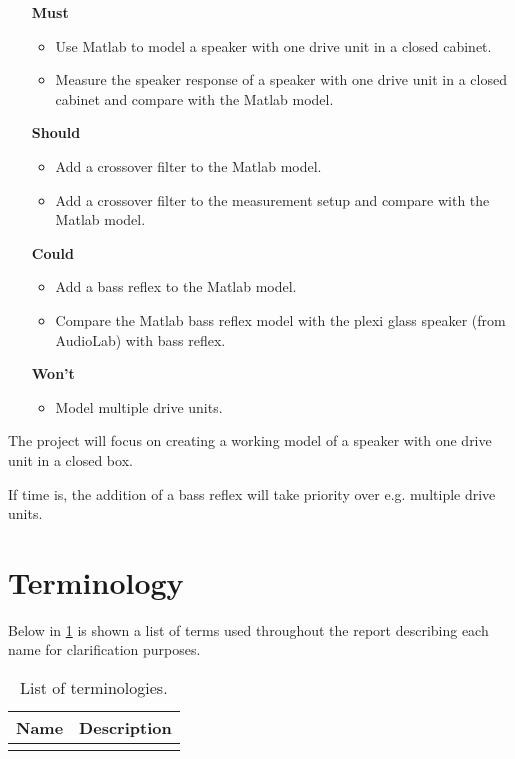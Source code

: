 \begin{itemize}
	\item[\textbf{Must}] 
	\begin{itemize}
		\item Use Matlab to model a speaker with one drive unit in a closed cabinet.
		\item Measure the speaker response of a speaker with one drive unit in a closed cabinet and compare with the Matlab model.
	\end{itemize}
	\item[\textbf{Should}] 
	\begin{itemize}
		\item Add a crossover filter to the Matlab model.
		\item Add a crossover filter to the measurement setup and compare with the Matlab model.
	\end{itemize}
	\item[\textbf{Could}] 
	\begin{itemize}
		\item Add a bass reflex to the Matlab model.
		\item Compare the Matlab bass reflex model with the plexi glass speaker (from AudioLab) with bass reflex.
	\end{itemize}
	\item[\textbf{Won't}] 
	\begin{itemize}
		\item Model multiple drive units.
	\end{itemize}
\end{itemize}

The project will focus on creating a working model of a speaker with one drive unit in a closed box.

If time is, the addition of a bass reflex will take priority over e.g. multiple drive units.

\section{Terminology}
\label{sec:terminology}
Below in \cref{tab:terminology} is shown a list of terms used throughout the report describing each name for clarification purposes.

\begin{table}[H]
	\centering
	\begin{tabularx}{0.8\textwidth}{l X}
		\toprule
		\textbf{Name} & \textbf{Description} \\
		\midrule
		&\\
		\bottomrule
	\end{tabularx}
	\caption{List of terminologies.}
	\label{tab:terminology}
\end{table}